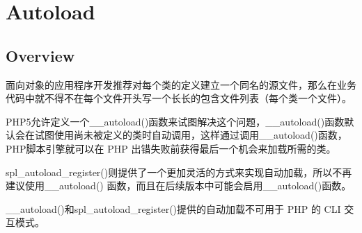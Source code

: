 \part{Autoload}


\chapter{Overview}


面向对象的应用程序开发推荐对每个类的定义建立一个同名的源文件，那么在业务代码中就不得不在每个文件开头写一个长长的包含文件列表（每个类一个文件）。


PHP5允许定义一个\_\_autoload()函数来试图解决这个问题，\_\_autoload()函数默认会在试图使用尚未被定义的类时自动调用，这样通过调用\_\_autoload()函数，PHP脚本引擎就可以在 PHP 出错失败前获得最后一个机会来加载所需的类。

spl\_autoload\_register()则提供了一个更加灵活的方式来实现自动加载，所以不再建议使用\_\_autoload() 函数，而且在后续版本中可能会启用\_\_autoload()函数。

\_\_autoload()和spl\_autoload\_register()提供的自动加载不可用于 PHP 的 CLI 交互模式。